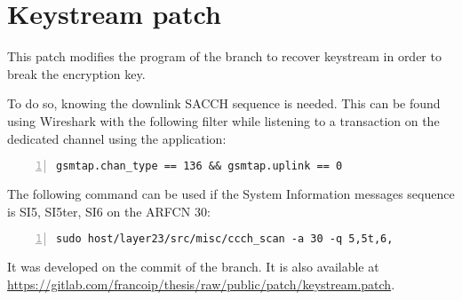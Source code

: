 \chapter{Keystream patch}
\label{app:keystream}

This patch modifies the  program of the
 branch to recover keystream in order to break
the encryption key.

To do so, knowing the downlink SACCH sequence is needed. This can be
found using Wireshark with the following filter while listening to a
transaction on the dedicated channel using the 
application:

\begin{lstlisting}[numbers=left,
basicstyle=\footnotesize, breaklines=true, frame=single]
gsmtap.chan_type == 136 && gsmtap.uplink == 0
\end{lstlisting}

The following command can be used if the System Information messages
sequence is SI5, SI5ter, SI6 on the ARFCN 30:

\begin{lstlisting}[numbers=left,
basicstyle=\footnotesize, breaklines=true, frame=single]
sudo host/layer23/src/misc/ccch_scan -a 30 -q 5,5t,6,
\end{lstlisting}

It was developed on the 
commit of the  branch. It is also available at
\url{https://gitlab.com/francoip/thesis/raw/public/patch/keystream.patch}.


